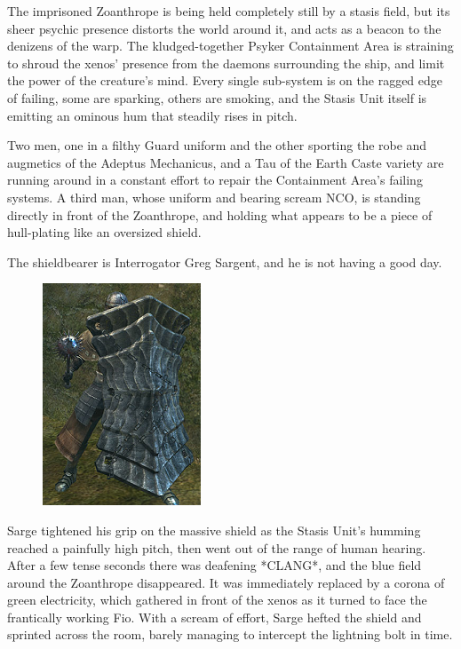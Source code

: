 The imprisoned Zoanthrope is being held completely still by a stasis field, but its sheer psychic presence distorts the world around it, and acts as a beacon to the denizens of the warp. 
The kludged-together Psyker Containment Area is straining to shroud the xenos' presence from the daemons surrounding the ship, and limit the power of the creature's mind. 
Every single sub-system is on the ragged edge of failing, some are sparking, others are smoking, and the Stasis Unit itself is emitting an ominous hum that steadily rises in pitch.

Two men, one in a filthy Guard uniform and the other sporting the robe and augmetics of the Adeptus Mechanicus, and a Tau of the Earth Caste variety are running around in a constant effort to repair the Containment Area's failing systems. 
A third man, whose uniform and bearing scream NCO, is standing directly in front of the Zoanthrope, and holding what appears to be a piece of hull-plating like an oversized shield.

The shieldbearer is Interrogator Greg Sargent, and he is not having a good day.

\begin{figure}
	\begin{center}
		\includegraphics[width=\figwidth]{pics/13/7.png}
	\end{center}
\end{figure}
Sarge tightened his grip on the massive shield as the Stasis Unit's humming reached a painfully high pitch, then went out of the range of human hearing. 
After a few tense seconds there was deafening *CLANG*, and the blue field around the Zoanthrope disappeared. 
It was immediately replaced by a corona of green electricity, which gathered in front of the xenos as it turned to face the frantically working Fio. 
With a scream of effort, Sarge hefted the shield and sprinted across the room, barely managing to intercept the lightning bolt in time.


